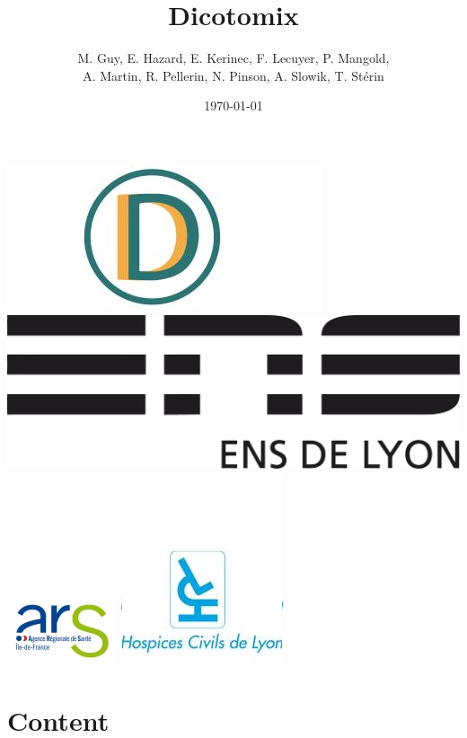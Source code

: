 \documentclass[notes]{beamer}
\title[Title]{Dicotomix}
\author[T.S]{M. Guy, E. Hazard, E. Kerinec, F. Lecuyer, P. Mangold,\\ A. Martin, R. Pellerin, N. Pinson, A. Slowik, T. Stérin}
\date{\today}
\begin{document}
\begin{frame}
	\titlepage
	\begin{center}
		\includegraphics[scale=0.2]{dicotomix}
		\includegraphics[scale=0.08]{logoens}
		\hspace{2em}
		\includegraphics[scale=0.55]{ars}
		\hspace{2em}
		\includegraphics[scale=0.3]{hospices_civils_de_lyon}
	\end{center}
\end{frame}

\section*{Content}
\begin{frame}
	\tableofcontents
\end{frame}
\end{document}
